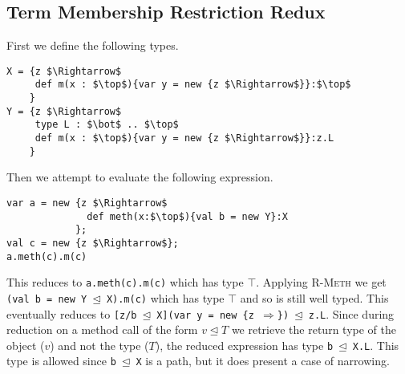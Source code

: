 \documentclass{llncs}
\begin{document}
\subsection{Term Membership Restriction Redux}
	\label{s:term_mem2}
First we define the following types.
\begin{lstlisting}[mathescape, style=custom_lang]
X = {z $\Rightarrow$
     def m(x : $\top$){var y = new {z $\Rightarrow$}}:$\top$
    }
Y = {z $\Rightarrow$
     type L : $\bot$ .. $\top$
     def m(x : $\top$){var y = new {z $\Rightarrow$}}:z.L
    }
\end{lstlisting}
Then we attempt to evaluate the following expression.
\begin{lstlisting}[mathescape, style=custom_lang]
var a = new {z $\Rightarrow$
              def meth(x:$\top$){val b = new Y}:X
            };
val c = new {z $\Rightarrow$};
a.meth(c).m(c)
\end{lstlisting}
This reduces to \texttt{a.meth(c).m(c)} which has type $\top$. 
Applying \textsc{R-Meth} we get \texttt{(val b = new Y $\unlhd$ X).m(c)}
which has type $\top$ and so is still well typed. This eventually reduces 
to \texttt{[z/b $\unlhd$ X](var y = new \{z $\Rightarrow$\}) $\unlhd$ z.L}.
Since during reduction on a method call of the form $v \unlhd T$
we retrieve the return type of the object ($v$) and 
not the type ($T$), the reduced expression has type \texttt{b $\unlhd$ X.L}. 
This type is allowed since \texttt{b $\unlhd$ X} is a path, but 
it does present a case of narrowing.
\end{document}
